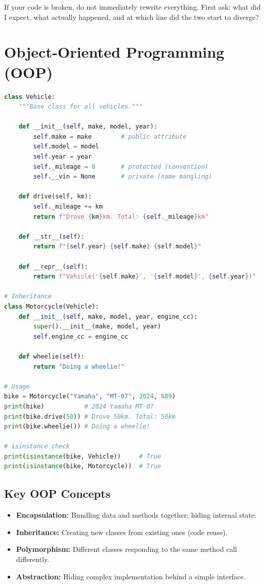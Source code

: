 \documentclass[12pt, a4paper, oneside]{book}
\begin{document}
\begin{warningbox}
If your code is broken, do not immediately rewrite everything. First ask: what did I expect, what actually happened, and at which line did the two start to diverge?
\end{warningbox}

\section{Object-Oriented Programming (OOP)}

\begin{lstlisting}[language=Python, caption={OOP in Python}]
class Vehicle:
    """Base class for all vehicles."""

    def __init__(self, make, model, year):
        self.make = make        # public attribute
        self.model = model
        self.year = year
        self._mileage = 0       # protected (convention)
        self.__vin = None       # private (name mangling)

    def drive(self, km):
        self._mileage += km
        return f"Drove {km}km. Total: {self._mileage}km"

    def __str__(self):
        return f"{self.year} {self.make} {self.model}"

    def __repr__(self):
        return f"Vehicle('{self.make}', '{self.model}', {self.year})"

# Inheritance
class Motorcycle(Vehicle):
    def __init__(self, make, model, year, engine_cc):
        super().__init__(make, model, year)
        self.engine_cc = engine_cc

    def wheelie(self):
        return "Doing a wheelie!"

# Usage
bike = Motorcycle("Yamaha", "MT-07", 2024, 689)
print(bike)           # 2024 Yamaha MT-07
print(bike.drive(50)) # Drove 50km. Total: 50km
print(bike.wheelie()) # Doing a wheelie!

# isinstance check
print(isinstance(bike, Vehicle))     # True
print(isinstance(bike, Motorcycle))  # True
\end{lstlisting}

\subsection{Key OOP Concepts}
\begin{itemize}[leftmargin=2em]
    \item \textbf{Encapsulation:} Bundling data and methods together; hiding internal state.
    \item \textbf{Inheritance:} Creating new classes from existing ones (code reuse).
    \item \textbf{Polymorphism:} Different classes responding to the same method call differently.
    \item \textbf{Abstraction:} Hiding complex implementation behind a simple interface.
\end{itemize}
\end{document}
